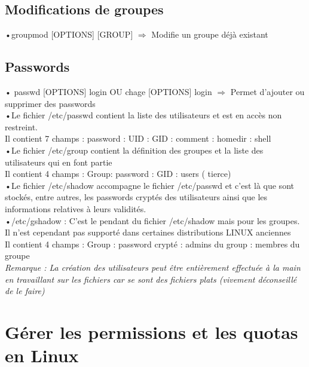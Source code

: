 \documentclass[a4paper, 11pt, french, oneside]{book}
\begin{document}
		\section{Modifications de groupes}
			•{\color{red}groupmod [OPTIONS] [GROUP]} $\Rightarrow$ Modifie un groupe déjà existant
		\section{Passwords}
			•\color{red}
			passwd [OPTIONS] login 
			{\color{black}OU}
			chage [OPTIONS] login
			\color{black}
			$\Rightarrow$ Permet d'ajouter ou supprimer des passwords\\
			•Le fichier {\color{blue}/etc/passwd} contient la liste des utilisateurs et est en accès non restreint.\\
			Il contient 7 champs : password : UID : GID : comment : homedir : shell\\
			•Le fichier {\color{blue}/etc/group} contient la définition des groupes et la liste des utilisateurs qui en font partie\\
			Il contient 4 champs : Group: password : GID : users ( tierce)\\
			•Le fichier {\color{blue}/etc/shadow} accompagne le fichier {\color{blue}/etc/passwd} et c’est là que sont stockés, entre autres, les passwords cryptés des utilisateurs ainsi que les informations relatives à leurs validités.\\
			•{\color{blue}/etc/gshadow} : C’est le pendant du fichier {\color{blue}/etc/shadow} mais pour les groupes. Il n’est cependant pas supporté dans certaines distributions LINUX anciennes\\
		Il contient 4 champs : Group : password crypté : admins du group : membres du groupe\\
			\textit{Remarque : La création des utilisateurs peut être entièrement effectuée à la main en travaillant sur les fichiers car se sont des fichiers plats (vivement déconseillé de le faire)}
	\chapter{Gérer les permissions et les quotas en Linux}
\end{document}
